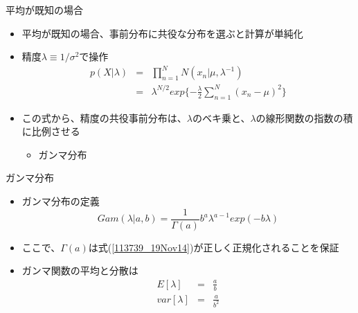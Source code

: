 \begin{frame}{平均が既知の場合}
 \begin{itemize}
  \item \alert{平均が既知}の場合、事前分布に共役な分布を選ぶと計算が単純化
  \item 精度$\lambda\equiv 1/\sigma^2$で操作
        \begin{eqnarray}
         p(X|\lambda) &=& \prod_{n=1}^{N}N(x_n|\mu,\lambda^{-1}) \nonumber \\
         &=& \lambda^{N/2}exp\{-\frac{\lambda}{2}\sum_{n=1}^{N}(x_n-\mu)^2\}\label{114403_19Nov14}
        \end{eqnarray}
  \item この式から、精度の共役事前分布は、$\lambda$のベキ乗と、$\lambda$の線形関数の指数の積に比例させる
        \begin{itemize}
         \item ガンマ分布
        \end{itemize}
 \end{itemize}
\end{frame}


\begin{frame}{ガンマ分布}
 \begin{itemize}
  \item ガンマ分布の定義
        \begin{equation}
         Gam(\lambda|a,b) = \frac{1}{\Gamma(a)}b^a\lambda^{a-1}exp(-b\lambda)\label{113739_19Nov14}
        \end{equation}
  \item ここで、$\Gamma(a)$は式(\ref{113739_19Nov14})が正しく正規化されることを保証
  \item ガンマ関数の平均と分散は
        \begin{eqnarray}
         E[\lambda] &=& \frac{a}{b}\\
         var[\lambda]& =& \frac{a}{b^2}
        \end{eqnarray}
 \end{itemize}
\end{frame}

